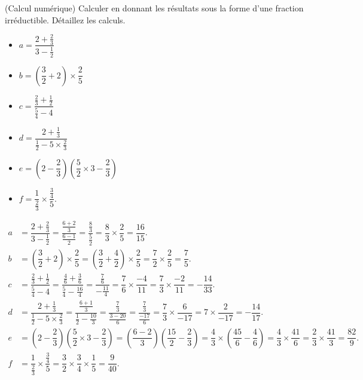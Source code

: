 \documentclass[12pt,
addpoints,
fleqn
]{exam}
\begin{document}
\begin{questions}

 \question (Calcul numérique) Calculer en donnant les résultats sous la forme d'une fraction irréductible. Détaillez les calculs.
 \begin{multicols}{3}
 \begin{itemize}
 \item[] $a= \dfrac{2+\frac{2}{3}}{3-\frac{1}{2}}$ \\
\item[] $b=\left( \dfrac{3}{2}+2\right)\times \dfrac{2}{5}$ \\
\item[] $c=\dfrac{\frac{2}{3}+\frac{1}{2}}{\frac{5}{4}-4}$ \\
 \item[] $d=\dfrac{2+\frac{1}{3}}{\frac{1}{2}-5\times\frac{2}{3}}$ \\
\item[] $ e=\left(2 - \dfrac{2}{3}\right)\left(\dfrac{5}{2}\times 3 - \dfrac{2}{3}\right)$ 
\item[] $f=\dfrac{1}{\frac{2}{3}}\times\dfrac{\frac{3}{4}}{5}.$
\end{itemize}
\end{multicols}

\begin{solution}
\begin{align*}
a &= \dfrac{2+\frac{2}{3}}{3-\frac{1}{2}} = \dfrac{\frac{6+2}{3}}{\frac{6-1}{2}} = \dfrac{\frac{8}{3}}{\frac{5}{2}} = \dfrac{8}{3}\times\dfrac{2}{5} = \boxed{\dfrac{16}{15}}. \\
b&=\left(\dfrac{3}{2}+2\right)\times \dfrac{2}{5} = \left(\dfrac{3}{2}+\dfrac{4}{2}\right)\times\dfrac{2}{5} = \dfrac{7}{2}\times \dfrac{2}{5} = \boxed{\dfrac{7}{5}}.\\
c&=\dfrac{\frac{2}{3}+\frac{1}{2}}{\frac{5}{4}-4} = \dfrac{\frac{4}{6}+\frac{3}{6}}{\frac{5}{4}-\frac{16}{4}}=\dfrac{\frac{7}{6}}{-\frac{11}{4}}=\dfrac{7}{6}\times\dfrac{-4}{11}=\dfrac{7}{3}\times\dfrac{-2}{11} = \boxed{-\dfrac{14}{33}}.\\
d&=\dfrac{2+\frac{1}{3}}{\frac{1}{2}-5\times\frac{2}{3}} = \dfrac{\frac{6+1}{3}}{\frac{1}{2}-\frac{10}{3}}=\dfrac{\frac{7}{3}}{\frac{3-20}{6}}=\dfrac{\frac{7}{3}}{\frac{-17}{6}}=\dfrac{7}{3}\times \dfrac{6}{-17} = 7\times\dfrac{2}{-17}=\boxed{-\dfrac{14}{17}}. \\
e&=\left(2-\dfrac{2}{3}\right)\left(\dfrac{5}{2}\times 3 - \dfrac{2}{3}\right) = \left(\dfrac{6-2}{3}\right)\left(\dfrac{15}{2}-\dfrac{2}{3}\right) = \dfrac{4}{3}\times\left( \dfrac{45}{6}-\dfrac{4}{6}\right) = \dfrac{4}{3}\times\dfrac{41}{6} =\dfrac{2}{3}\times\dfrac{41}{3} = \boxed{\dfrac{82}{9}}. \\
f&=\dfrac{1}{\frac{2}{3}}\times\dfrac{\frac{3}{4}}{5} = \dfrac{3}{2}\times\dfrac{3}{4}\times\dfrac{1}{5}= \boxed{\dfrac{9}{40}}.
\end{align*}


\end{solution}
\end{questions}
\end{document}
